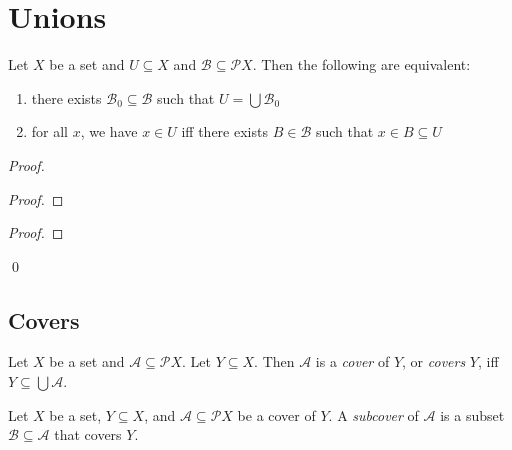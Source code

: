 \section{Unions}

\begin{prop}
  \label{prop:set_theory:unions}
  Let $X$ be a set and $U \subseteq X$ and $\mathcal{B} \subseteq \mathcal{P} X$. Then the following are equivalent:
  \begin{enumerate}
    \item there exists $\mathcal{B}_0 \subseteq \mathcal{B}$ such that $U = \bigcup \mathcal{B}_0$
    \item for all $x$, we have $x \in U$ iff there exists $B \in \mathcal{B}$ such that $x \in B \subseteq U$
  \end{enumerate}
\end{prop}

\begin{proof}
  \pf
  \begin{proof}
  \end{proof}
  \begin{proof}
  \end{proof}
  \qed
\end{proof}

\subsection{Covers}

\begin{df}[Cover]
  Let $X$ be a set and $\mathcal{A} \subseteq \mathcal{P} X$. Let $Y \subseteq X$. Then $\mathcal{A}$ is a \emph{cover} of $Y$, or \emph{covers} $Y$, iff $Y \subseteq \bigcup \mathcal{A}$.
\end{df}

\begin{df}[Subcover]
  Let $X$ be a set, $Y \subseteq X$, and $\mathcal{A} \subseteq \mathcal{P} X$ be a cover of $Y$. A \emph{subcover} of $\mathcal{A}$ is a subset $\mathcal{B} \subseteq \mathcal{A}$ that covers $Y$.
\end{df}

